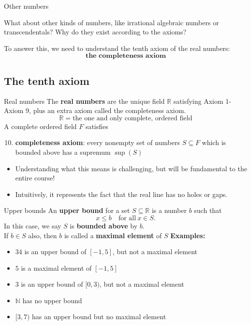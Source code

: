 \documentclass{beamer}
\begin{document}
\begin{frame}{Other numbers}
\begin{quest}
What about other kinds of numbers, like irrational algebraic numbers or transcendentals?  Why do they exist {\color{red}according to the axioms}?
\end{quest}
To answer this, we need to understand the tenth axiom of the real numbers:
$$\textbf{the completeness axiom}$$
\end{frame}


\subsection{The tenth axiom}

\begin{frame}{Real numbers}
The \textbf{real numbers} are the unique field $\mathbb{R}$ satisfying Axiom 1-Axiom 9, plus an extra axiom called the completeness axiom.
$$\mathbb{R} = \text{the one and only complete, ordered field}$$
A complete ordered field $F$ satisfies
\begin{enumerate}[\text{A}1]
\setcounter{enumi}{9}
\pause
\item \textbf{completeness axiom}: every nonempty set of numbers $S\subseteq F$ which is bounded above has a supremum $\sup(S)$
\end{enumerate}
\begin{itemize}
\pause
\item Understanding what this means is challenging, but will be fundamental to the entire course!
\pause
\item Intuitively, it represents the fact that the real line has no holes or gaps.
\end{itemize}
\end{frame}
\begin{frame}{Upper bounds}
An \textbf{upper bound} for a set $S\subseteq\mathbb{R}$ is a number $b$ such that
$$x \leq b\quad\text{for all}\ x\in S.$$
\pause
In this case, we say $S$ is \textbf{bounded above} by $b$.\\
\pause
If $b\in S$ also, then $b$ is called a \textbf{maximal element} of $S$
\pause
\textbf{Examples:}
\begin{itemize}
\pause
\item $34$ is an upper bound of $[-1,5]$, but not a maximal element
\pause
\item $5$ is a maximal element of $[-1,5]$
\pause
\item $3$ is an upper bound of $[0,3)$, but not a maximal element
\pause
\item $\mathbb{N}$ has no upper bound
\pause
\item $[3,7)$ has an upper bound but no maximal element
\end{itemize}
\end{frame}
\end{document}
